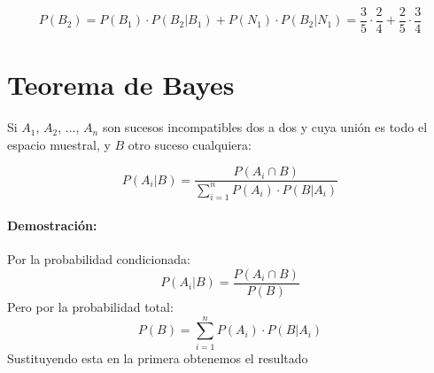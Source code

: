 


$$P(B_2)=P(B_1)\cdot P(B_2|B_1) + P(N_1)\cdot P(B_2|N_1)
= \frac{3}{5}\cdot\frac{2}{4} + \frac{2}{5}\cdot\frac{3}{4}$$

\section{Teorema de Bayes}

Si $A_1$, $A_2$, ..., $A_n$   son sucesos incompatibles dos a dos y cuya unión es todo el espacio muestral, y $B$ otro suceso cualquiera:

$$P(A_i|B)=\dfrac{P(A_i \cap B)}{\sum_{i=1}^n P(A_i)\cdot  P(B|A_i)} $$

\paragraph{Demostración:} Por la probabilidad condicionada:
$$P(A_i|B)=\dfrac{P(A_i \cap B)}{P(B)} $$
Pero por la probabilidad total:
$$P(B)=\sum_{i=1}^n P(A_i)\cdot  P(B|A_i)$$
Sustituyendo esta en la primera obtenemos el resultado
